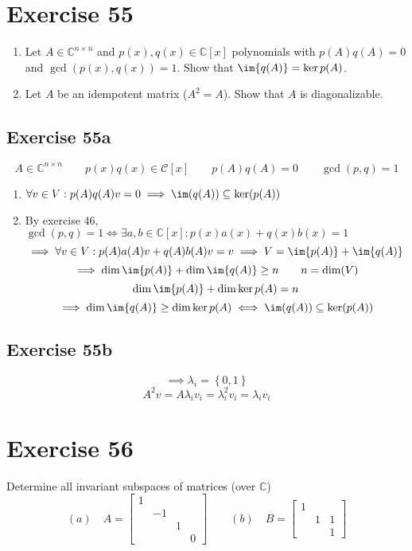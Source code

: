 \documentclass[a4paper]{article}
\theoremstyle{definition}
\newcommand\set[1]{\left\{#1\right\}}
\begin{document}
\section{Exercise 55}
\begin{ex}
  \begin{enumerate}
    \item Let $A \in \mathbb C^{n \times n}$ and $p(x), q(x) \in \mathbb C[x]$ polynomials with $p(A) q(A) = 0$ and $\operatorname{gcd}(p(x), q(x)) = 1$. Show that $\im{q(A)} = \ker{p(A)}$.
    \item Let $A$ be an idempotent matrix ($A^2 = A$). Show that $A$ is diagonalizable.
  \end{enumerate}
\end{ex}

\subsection{Exercise 55a}

\[ A \in \mathbb C^{n \times n} \qquad p(x) q(x) \in \mathcal C[x] \qquad p(A) q(A) = 0 \qquad \operatorname{gcd}(p,q) = 1 \]
\begin{enumerate}
  \item $\forall v \in V: p(A) q(A) v = 0 \implies \im(q(A)) \subseteq \ker(p(A))$
  \item By exercise 46, $\operatorname{gcd}(p,q) = 1 \iff \exists a, b \in \mathbb C[x]: p(x) a(x) + q(x) b(x) = 1$
    \[ \implies \forall v \in V: p(A) a(A) v + q(A) b(A) v = v \implies V = \im{p(A)} + \im{q(A)} \]
    \[ \implies \dim\im{p(A)} + \dim\im{q(A)} \geq n \qquad n = \dim(V) \]
    \[ \dim{\im{p(A)}} + \dim{\ker{p(A)}} = n \]
    \[ \implies \dim\im{q(A)} \geq \dim\ker{p(A)} \iff \im(q(A)) \subseteq \ker(p(A)) \]
\end{enumerate}

\subsection{Exercise 55b}
\[ \implies \lambda_i = \set{0, 1} \]
\[ A^2 v = A \lambda_i v_i = \lambda_i^2 v_i = \lambda_i v_i \]

\section{Exercise 56}
\begin{ex}
  Determine all invariant subspaces of matrices (over $\mathbb C$)
  \[
    (a) \quad A = \begin{bmatrix} 1 & & & \\ & -1 & & \\ & & 1 & \\ & & & 0 \end{bmatrix} \qquad
    (b) \quad B = \begin{bmatrix} 1 & & \\ & 1 & 1 \\ & & 1 \end{bmatrix}
  \]
\end{ex}
\end{document}
